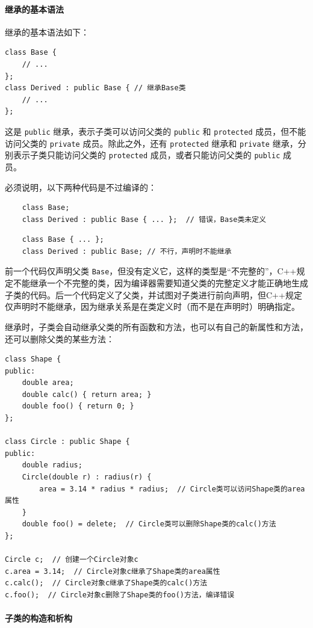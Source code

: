 \paragraph{继承的基本语法}

继承的基本语法如下：
\begin{verbatim}
class Base {
    // ...
};
class Derived : public Base { // 继承Base类
    // ...
};
\end{verbatim}
这是 \verb|public| 继承，表示子类可以访问父类的 \verb|public| 和 \verb|protected| 成员，但不能访问父类的 \verb|private| 成员。除此之外，还有 \verb|protected| 继承和 \verb|private| 继承，分别表示子类只能访问父类的 \verb|protected| 成员，或者只能访问父类的 \verb|public| 成员。

必须说明，以下两种代码是不过编译的：
\begin{verbatim}
    class Base;
    class Derived : public Base { ... };  // 错误，Base类未定义
\end{verbatim}
\begin{verbatim}
    class Base { ... };
    class Derived : public Base; // 不行，声明时不能继承
\end{verbatim}
前一个代码仅声明父类 \verb|Base|，但没有定义它，这样的类型是“不完整的”，C++规定不能继承一个不完整的类，因为编译器需要知道父类的完整定义才能正确地生成子类的代码。后一个代码定义了父类，并试图对子类进行前向声明，但C++规定仅声明时不能继承，因为继承关系是在类定义时（而不是在声明时）明确指定。

继承时，子类会自动继承父类的所有函数和方法，也可以有自己的新属性和方法，还可以删除父类的某些方法：
\begin{verbatim}
class Shape {
public:
    double area;
    double calc() { return area; }
    double foo() { return 0; }
};

class Circle : public Shape {
public:
    double radius;
    Circle(double r) : radius(r) {
        area = 3.14 * radius * radius;  // Circle类可以访问Shape类的area属性
    }
    double foo() = delete;  // Circle类可以删除Shape类的calc()方法
};

Circle c;  // 创建一个Circle对象c
c.area = 3.14;  // Circle对象c继承了Shape类的area属性
c.calc();  // Circle对象c继承了Shape类的calc()方法
c.foo();  // Circle对象c删除了Shape类的foo()方法，编译错误
\end{verbatim}

\paragraph{子类的构造和析构} 

